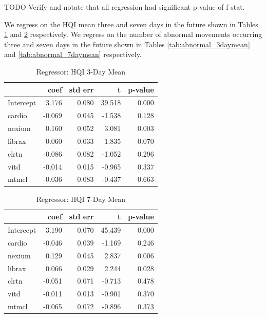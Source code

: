 \documentclass[conference]{IEEEtran}
\begin{document}
TODO Verify and notate that all regression had significant p-value of f stat.

We regress on the HQI mean three and seven days in the future shown in Tables \ref{tab:hqi_3daymean} and \ref{tab:hqi_7daymean} respectively. We regress on the number of abnormal movements occurring three and seven days in the future shown in Tables \ref{tab:abnormal_3daymean} and \ref{tab:abnormal_7daymean} respectively.

\begin{table}
\begin{center}
\caption {Regressor: HQI 3-Day Mean} \label{tab:hqi_3daymean}
    \begin{tabular}{ | l | r | r | r | r |}
    \hline
     & coef & std err & t & p-value \\ \hline
Intercept & 3.176 & 0.080 & 39.518 & 0.000 \\
cardio & -0.069 & 0.045 & -1.538 & 0.128 \\
nexium & 0.160 & 0.052 & 3.081 & 0.003 \\
librax & 0.060 & 0.033 & 1.835 & 0.070 \\
clrtn & -0.086 & 0.082 & -1.052 & 0.296 \\
vitd & -0.014 & 0.015 & -0.965 & 0.337 \\
mtmcl & -0.036 & 0.083 & -0.437 & 0.663 \\
    \hline
\end{tabular}
\end{center}
    \end{table}

\begin{table}
\begin{center}
\caption {Regressor: HQI 7-Day Mean} \label{tab:hqi_7daymean}
    \begin{tabular}{ | l | r | r | r | r |}
    \hline
     & coef & std err & t & p-value \\ \hline
Intercept & 3.190 & 0.070 & 45.439 & 0.000 \\
cardio & -0.046 & 0.039 & -1.169 & 0.246 \\
nexium & 0.129 & 0.045 & 2.837 & 0.006 \\
librax & 0.066 & 0.029 & 2.244 & 0.028 \\
clrtn & -0.051 & 0.071 & -0.713 & 0.478 \\
vitd & -0.011 & 0.013 & -0.901 & 0.370 \\
mtmcl & -0.065 & 0.072 & -0.896 & 0.373 \\
    \hline
    \end{tabular}
\end{center}
\end{table}
\end{document}
